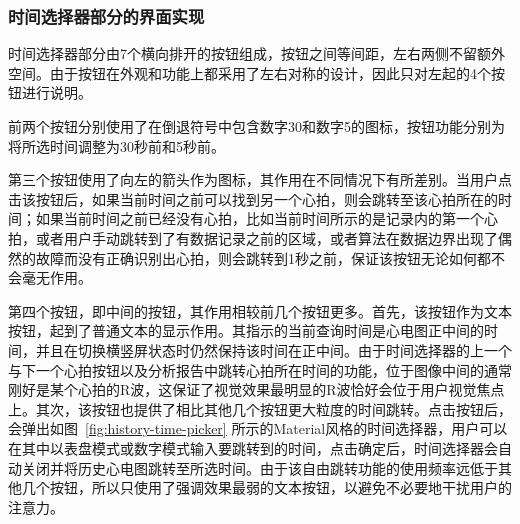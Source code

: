 \subsubsection{时间选择器部分的界面实现}\label{subsubsec:history-time-picker-ui}

时间选择器部分由7个横向排开的按钮组成，按钮之间等间距，左右两侧不留额外空间。由于按钮在外观和功能上都采用了左右对称的设计，因此只对左起的4个按钮进行说明。

前两个按钮分别使用了在倒退符号中包含数字30和数字5的图标，按钮功能分别为将所选时间调整为30秒前和5秒前。

第三个按钮使用了向左的箭头作为图标，其作用在不同情况下有所差别。当用户点击该按钮后，如果当前时间之前可以找到另一个心拍，则会跳转至该心拍所在的时间；如果当前时间之前已经没有心拍，比如当前时间所示的是记录内的第一个心拍，或者用户手动跳转到了有数据记录之前的区域，或者算法在数据边界出现了偶然的故障而没有正确识别出心拍，则会跳转到1秒之前，保证该按钮无论如何都不会毫无作用。

第四个按钮，即中间的按钮，其作用相较前几个按钮更多。首先，该按钮作为文本按钮，起到了普通文本的显示作用。其指示的当前查询时间是心电图正中间的时间，并且在切换横竖屏状态时仍然保持该时间在正中间。由于时间选择器的上一个与下一个心拍按钮以及分析报告中跳转心拍所在时间的功能，位于图像中间的通常刚好是某个心拍的R波，这保证了视觉效果最明显的R波恰好会位于用户视觉焦点上。其次，该按钮也提供了相比其他几个按钮更大粒度的时间跳转。点击按钮后，会弹出如图~\ref{fig:history-time-picker} 所示的Material风格的时间选择器，用户可以在其中以表盘模式或数字模式输入要跳转到的时间，点击确定后，时间选择器会自动关闭并将历史心电图跳转至所选时间。由于该自由跳转功能的使用频率远低于其他几个按钮，所以只使用了强调效果最弱的文本按钮，以避免不必要地干扰用户的注意力。

